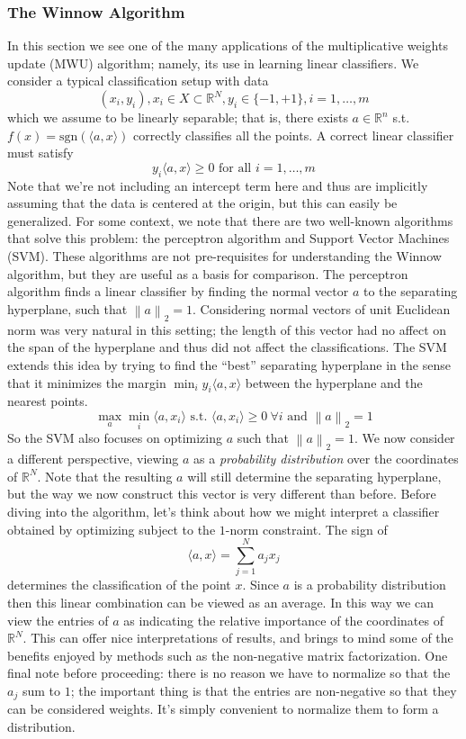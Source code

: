 \documentclass[12pt]{article}
\newcommand*{\norm}[1]{\left\lVert#1\right\rVert}
\newcommand{\R}{\mathcal{R}}
\def\R{\mathbb{R}}
\begin{document}
\subsubsection{The Winnow Algorithm}
In this section we see one of the many applications of the multiplicative weights update (MWU) algorithm; namely, its use in learning linear classifiers. We consider a typical classification setup
with data
\[(x_i, y_i), x_i \in X \subset \R^N, y_i \in \{-1, +1\}, i = 1, \dots, m \]
which we assume to be linearly separable; that is, there exists $a \in \R^n$ s.t. $f(x) = \text{sgn}(\langle a, x\rangle)$ correctly classifies all the points. A correct linear classifier must satisfy
\[y_i \langle a, x\rangle \geq 0 \text{ for all } i = 1, \dots, m\]
Note that we're not including an intercept term here and thus are implicitly assuming that the data is centered at the origin, but this can easily be generalized. For some context, we note that 
there are two well-known algorithms that solve this problem: the perceptron algorithm and Support Vector Machines (SVM). These algorithms are not pre-requisites for understanding the Winnow 
algorithm, but they are useful as a basis for comparison. The perceptron algorithm finds a linear classifier by finding the normal vector $a$ to the separating hyperplane, such that $\norm{a}_2 = 1$. 
Considering normal vectors of unit Euclidean norm was very natural in this setting; the length of this vector had no affect on the span of the hyperplane and thus did not affect the classifications. 
The SVM extends this idea by trying to find the ``best'' separating hyperplane in the sense that it minimizes the margin $\min_{i} y_i \langle a, x \rangle$ between the hyperplane and the nearest points. 
\[\max_a \min_i \langle a, x_i \rangle \text{ s.t. } \langle a, x_i \rangle \geq 0 \ \forall i \text{ and } \norm{a}_2 = 1\]
So the SVM also focuses on optimizing $a$ such that $\norm{a}_2 = 1$. We now consider a different perspective, viewing $a$ as a 
\textit{probability distribution} over the coordinates of $\R^N$. Note that the resulting $a$ will still determine the separating hyperplane, but the way we now construct this vector is very different than before. 
Before diving into the algorithm, let's think about how we might interpret a classifier obtained by optimizing subject to the $1$-norm constraint. The sign of 
\[\langle a, x\rangle = \sum_{j = 1}^{N} a_j x_j\]
determines the classification of the point $x$. Since $a$ is a probability distribution then this linear combination can be viewed as an average. In this way we can view the entries of $a$ as indicating the relative
importance of the coordinates of $\R^N$. This can offer nice interpretations of results, and brings to mind some of the benefits enjoyed by methods such as the non-negative matrix factorization. One final note 
before proceeding: there is no reason we have to normalize so that the $a_j$ sum to $1$; the important thing is that the entries are non-negative so that they can be considered weights. It's simply convenient 
to normalize them to form a distribution. 
\end{document}
